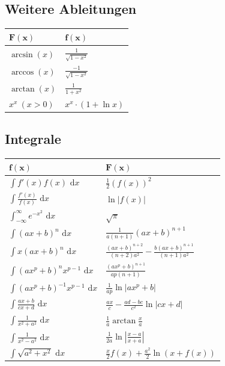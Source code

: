 \documentclass[a4paper,10pt]{article}
\def\dx{\text{ d}x}
\begin{document}
\subsection{Weitere Ableitungen}
\begin{center}
  \begin{tabularx}{\linewidth}{>{\centering\arraybackslash}X>{\centering\arraybackslash}X}
  \toprule
  $\displaystyle \mathbf{F(x)}$ &
  $\displaystyle \mathbf{f(x)}$ \\
  \midrule
  $\displaystyle \arcsin(x)$ &
  $\displaystyle \frac{1}{\sqrt{1 - x^2}}$ \\
  $\displaystyle \arccos(x)$ &
  $\displaystyle \frac{-1}{\sqrt{1 - x^2}}$ \\
  $\displaystyle \arctan(x)$ &
  $\displaystyle \frac{1}{1 + x^2}$ \\ 
  $\displaystyle x^x \ (x > 0)$ &
  $\displaystyle x^x \cdot (1 + \ln x)$ \\
  \bottomrule
  \end{tabularx}
\end{center}

\subsection{Integrale}
\begin{center}
\begin{tabularx}{\linewidth}{>{\centering\arraybackslash}X>{\centering\arraybackslash}X}
 \toprule
 $\displaystyle \mathbf{f(x)}$ &
 $\displaystyle \mathbf{F(x)}$ \\
 \midrule
 $\displaystyle \int f'(x) f(x) \dx$ &
 $\displaystyle \frac{1}{2}(f(x))^2$ \\
 $\displaystyle \int \frac{f'(x)}{f(x)} \dx$ &
 $\displaystyle \ln|f(x)|$ \\
 $\displaystyle \int_{-\infty}^\infty e^{-x^2} \dx$ &
 $\displaystyle \sqrt{\pi}$ \\
 $\displaystyle \int (ax+b)^n \dx$ &
 $\displaystyle \frac{1}{a(n+1)}(ax+b)^{n+1}$ \\
 $\displaystyle \int x(ax+b)^n \dx$ &
 $\displaystyle \frac{(ax+b)^{n+2}}{(n+2)a^2} - \frac{b(ax+b)^{n+1}}{(n+1)a^2}$ \\
 $\displaystyle \int (ax^p+b)^n x^{p-1} \dx$ &
 $\displaystyle \frac{(ax^p+b)^{n+1}}{ap(n+1)}$ \\
 $\displaystyle \int (ax^p + b)^{-1} x^{p-1} \dx$ &
 $\displaystyle \frac{1}{ap} \ln |ax^p + b|$ \\
 $\displaystyle \int \frac{ax+b}{cx+d} \dx$ &
 $\displaystyle \frac{ax}{c} - \frac{ad-bc}{c^2} \ln |cx +d|$ \\
 $\displaystyle \int \frac{1}{x^2+a^2} \dx$ &
 $\displaystyle \frac{1}{a} \arctan \frac{x}{a}$ \\
 $\displaystyle \int \frac{1}{x^2 - a^2} \dx$ &
 $\displaystyle \frac{1}{2a} \ln\left| \frac{x-a}{x+a} \right|$ \\
 $\displaystyle \int \sqrt{a^2+x^2} \dx $ &
 $\displaystyle \frac{x}{2}f(x) + \frac{a^2}{2}\ln(x+f(x))$ \\
 \bottomrule
\end{tabularx}
\end{center}
\end{document}
